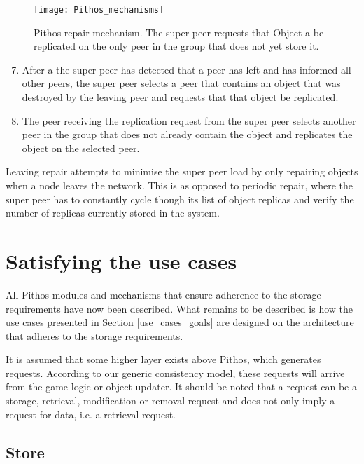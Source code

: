 \begin{figure}[htbp]
 \centering
 \texttt{[image: Pithos\_mechanisms]}
 \caption{Pithos repair mechanism. The super peer requests that Object a be replicated on the only peer in the group that does not yet store it.}
 \label{fig_pithos_repair}
\end{figure}
%
\begin{enumerate}
\setcounter{enumi}{6}
\item After a the super peer has detected that a peer has left and has informed all other peers, the super peer selects a peer that contains an object that was destroyed by the leaving peer and requests that that object be replicated.

\item The peer receiving the replication request from the super peer selects another peer in the group that does not already contain the object and replicates the object on the selected peer.
\end{enumerate}

Leaving repair attempts to minimise the super peer load by only repairing objects when a node leaves the network. This is as opposed to periodic repair, where the super peer has to constantly cycle though its list of object replicas and verify the number of replicas currently stored in the system.

\section{Satisfying the use cases}
All Pithos modules and mechanisms that ensure adherence to the storage requirements have now been described. What remains to be described is how the use cases presented in Section \ref{use_cases_goals} are designed on the architecture that adheres to the storage requirements.

It is assumed that some higher layer exists above Pithos, which generates requests. According to our generic consistency model, these requests will arrive from the game logic or object updater. It should be noted that a request can be a storage, retrieval, modification or removal request and does not only imply a request for data, i.e. a retrieval request.

\subsection{Store}
\label{pithos_store}

